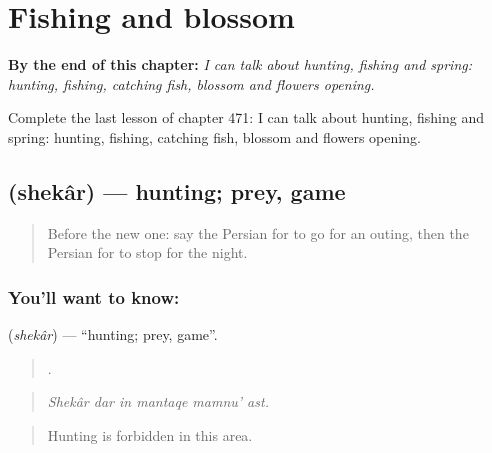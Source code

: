 
\chapter{Fishing and blossom}
\label{ch:fa-fishing-and-blossom}

\begin{chapteropening}
\textbf{By the end of this chapter:} \emph{I can talk about hunting, fishing and spring: hunting, fishing, catching fish, blossom and flowers opening.}

Complete the last lesson of chapter 471: I can talk about hunting, fishing and spring: hunting, fishing, catching fish, blossom and flowers opening.
\end{chapteropening}

\section[\texorpdfstring{\fa{شکار} (shekâr)}{شکار (shekâr)}]{ (shekâr) — hunting; prey, game}

\label{lesson:FA-C471-shekar}



\begin{quote}
Before the new one: say the Persian for to go for an outing, then the Persian for to stop for the night.
\end{quote}

\subsection*{You'll want to know: }
\textbf{} (\emph{shekâr}) — \textquotedblleft{}hunting; prey, game\textquotedblright{}.

\begin{quote}
     .
\end{quote}

\begin{quote}
\emph{Shekâr dar in mantaqe mamnu' ast.}
\end{quote}

\begin{quote}
Hunting is forbidden in this area.
\end{quote}

